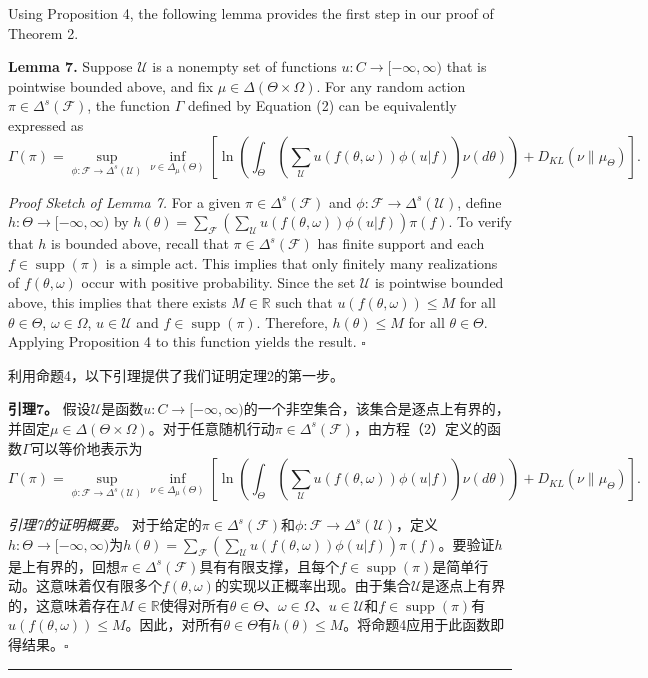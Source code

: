 \documentclass[12pt,a4paper]{article}
\newenvironment{original}
  {\par\noindent\color{black}\smallskip}
  {\par\smallskip}
\newenvironment{translation}
  {\par\noindent\color{blue!70!black}\smallskip}
  {\par\medskip\hrule\medskip}
\begin{document}
\begin{original}
Using Proposition 4, the following lemma provides the first step in our proof of Theorem 2.

\textbf{Lemma 7.} Suppose $\mathcal{U}$ is a nonempty set of functions $u: C \to [-\infty, \infty)$ that is pointwise bounded above, and fix $\mu \in \Delta(\Theta \times \Omega)$. For any random action $\pi \in \Delta^s(\mathcal{F})$, the function $\Gamma$ defined by Equation (2) can be equivalently expressed as
\[
\Gamma(\pi) = \sup_{\phi: \mathcal{F} \to \Delta^s(\mathcal{U})} \inf_{\nu \in \Delta_\mu(\Theta)} \left[ \ln\left( \int_\Theta \left( \sum_{\mathcal{U}} u(f(\theta, \omega)) \phi(u|f) \right) \nu(d\theta) \right) + D_{KL}(\nu\|\mu_\Theta) \right].
\]

\textit{Proof Sketch of Lemma 7.} For a given $\pi \in \Delta^s(\mathcal{F})$ and $\phi: \mathcal{F} \to \Delta^s(\mathcal{U})$, define $h: \Theta \to [-\infty, \infty)$ by $h(\theta) = \sum_{\mathcal{F}} \left( \sum_{\mathcal{U}} u(f(\theta, \omega)) \phi(u|f) \right) \pi(f)$. To verify that $h$ is bounded above, recall that $\pi \in \Delta^s(\mathcal{F})$ has finite support and each $f \in \operatorname{supp}(\pi)$ is a simple act. This implies that only finitely many realizations of $f(\theta, \omega)$ occur with positive probability. Since the set $\mathcal{U}$ is pointwise bounded above, this implies that there exists $M \in \mathbb{R}$ such that $u(f(\theta, \omega)) \leq M$ for all $\theta \in \Theta$, $\omega \in \Omega$, $u \in \mathcal{U}$ and $f \in \operatorname{supp}(\pi)$. Therefore, $h(\theta) \leq M$ for all $\theta \in \Theta$. Applying Proposition 4 to this function yields the result. $\square$
\end{original}
\begin{translation}
利用命题4，以下引理提供了我们证明定理2的第一步。

\textbf{引理7。} 假设$\mathcal{U}$是函数$u: C \to [-\infty, \infty)$的一个非空集合，该集合是逐点上有界的，并固定$\mu \in \Delta(\Theta \times \Omega)$。对于任意随机行动$\pi \in \Delta^s(\mathcal{F})$，由方程（2）定义的函数$\Gamma$可以等价地表示为
\[
\Gamma(\pi) = \sup_{\phi: \mathcal{F} \to \Delta^s(\mathcal{U})} \inf_{\nu \in \Delta_\mu(\Theta)} \left[ \ln\left( \int_\Theta \left( \sum_{\mathcal{U}} u(f(\theta, \omega)) \phi(u|f) \right) \nu(d\theta) \right) + D_{KL}(\nu\|\mu_\Theta) \right].
\]

\textit{引理7的证明概要。} 对于给定的$\pi \in \Delta^s(\mathcal{F})$和$\phi: \mathcal{F} \to \Delta^s(\mathcal{U})$，定义$h: \Theta \to [-\infty, \infty)$为$h(\theta) = \sum_{\mathcal{F}} \left( \sum_{\mathcal{U}} u(f(\theta, \omega)) \phi(u|f) \right) \pi(f)$。要验证$h$是上有界的，回想$\pi \in \Delta^s(\mathcal{F})$具有有限支撑，且每个$f \in \operatorname{supp}(\pi)$是简单行动。这意味着仅有限多个$f(\theta, \omega)$的实现以正概率出现。由于集合$\mathcal{U}$是逐点上有界的，这意味着存在$M \in \mathbb{R}$使得对所有$\theta \in \Theta$、$\omega \in \Omega$、$u \in \mathcal{U}$和$f \in \operatorname{supp}(\pi)$有$u(f(\theta, \omega)) \leq M$。因此，对所有$\theta \in \Theta$有$h(\theta) \leq M$。将命题4应用于此函数即得结果。$\square$
\end{translation}
\end{document}
